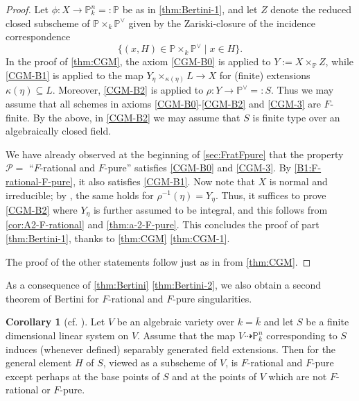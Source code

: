 \documentclass[reqno,11pt]{amsart}
\numberwithin{equation}{section}
\theoremstyle{definition}
\theoremstyle{definition}
\newtheorem{corollary}[theorem]{Corollary}
\theoremstyle{definition}
\theoremstyle{remark}
\newcommand{\PP}{\mathbb{P}}
\newcommand{\cP}{\mathcal{P}}
\begin{document}
\begin{proof}
    Let $\phi\colon X\to \PP^n_k=:\PP$ be as in \ref{thm:Bertini-1}, and let $Z$ denote the reduced closed subscheme of $\PP \times_k \PP^\vee$ given by the Zariski-closure of the incidence correspondence
\begin{equation*}
    \{(x,H)\in \PP \times_k \PP^\vee\mid x\in H\}.
\end{equation*}
In the proof of \cref{thm:CGM}, the axiom \ref{CGM-B0} is applied to $Y:=X \times_\PP Z$, while \ref{CGM-B1} is applied to the map $Y_{\eta}\times_{\kappa(\eta)} L\to X$ for (finite) extensions $\kappa(\eta)\subseteq L$. Moreover, \ref{CGM-B2} is applied to $\rho\colon Y\to \PP^\vee=: S$. Thus we may assume that all schemes in axioms \ref{CGM-B0}-\ref{CGM-B2} and \ref{CGM-3} are $F$-finite. By the above, in \ref{CGM-B2} we may assume that $S$ is finite type over an algebraically closed field.

We have already observed at the beginning of \cref{sec:FratFpure} that the property $\cP=$ ``$F$-rational and $F$-pure'' satisfies \ref{CGM-B0} and \ref{CGM-3}. By \cref{B1:F-rational-F-pure}, it also satisfies \ref{CGM-B1}. Now note that $X$ is normal and irreducible; by \cite[Proposition 1.5.10 and Corollary 3.4.14]{FOV99}, the same holds for $\rho^{-1}(\eta) = Y_\eta$. Thus, it suffices to prove \ref{CGM-B2} where $Y_\eta$ is further assumed to be integral, and this follows from \cref{cor:A2-F-rational} and \cref{thm:a-2-F-pure}. This concludes the proof of part \ref{thm:Bertini-1}, thanks to \cref{thm:CGM} \ref{thm:CGM-1}. 


The proof of the other statements follow just as in \cite{CGM86} from \cref{thm:CGM}.
\end{proof}

    As a consequence of \cref{thm:Bertini} \ref{thm:Bertini-2}, we also obtain a second theorem of Bertini for $F$-rational and $F$-pure singularities.


\begin{corollary}[cf. {\cite[Corollary 1]{CGM86}}]
    Let $V$ be an algebraic variety over $k=\overline{k}$ and let $S$ be a finite dimensional linear system on $V$. Assume that the map $V\dashrightarrow\PP^n_k$ corresponding to $S$ induces (whenever defined) separably generated field extensions. Then for the general element $H$ of $S$, viewed as a subscheme of $V$, is $F$-rational and $F$-pure except perhaps at the base points of $S$ and at the points of $V$ which are not $F$-rational or $F$-pure.
\end{corollary}
\end{document}

